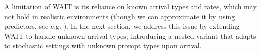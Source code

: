 






A limitation of WAIT is its reliance on known arrival types and rates, which may not hold in realistic environments (though we can approximate it by using predictors, see e.g. \citep{fu2024efficient}). In the next section, we address this issue by extending WAIT to handle unknown arrival types, introducing a nested variant that adapts to stochastic settings with unknown prompt types upon arrival.